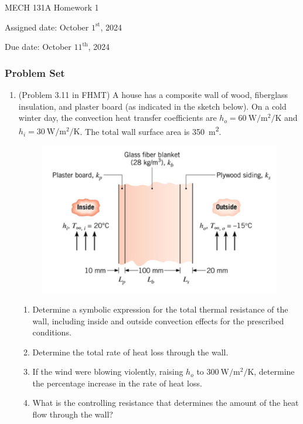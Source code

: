 \documentclass[12pt,letterpaper]{article}
\begin{document}
\noindent
MECH 131A Homework 1

\noindent
Assigned date: October $1^{\mathrm{st}}$, 2024

\noindent
Due date: October $11^{\mathrm{th}}$, 2024

\subsubsection*{Problem Set}
\begin{enumerate}

\item  (Problem 3.11 in FHMT) A house has a composite wall of wood, fiberglass insulation, and plaster board (as indicated in the sketch below).
On a cold winter day, the convection heat transfer coefficients are $h_o = \SI{60}{\watt\per\square\meter\per\kelvin}$ and $h_i = \SI{30}{\watt\per\square\meter\per\kelvin}$.
The total wall surface area is \SI{350}{\square\meter}.

\begin{figure}[!htpb]
	\centering
	\includegraphics[width=0.75\linewidth]{./image0.png}
\end{figure}

	\begin{enumerate}
		\item Determine a symbolic expression for the total thermal resistance of the wall, including inside and outside convection effects for the prescribed conditions.
		\item Determine the total rate of heat loss through the wall.
		\item If the wind were blowing violently, raising $h_o$ to $\SI{300}{\watt\per\square\meter\per\kelvin}$, determine the percentage increase in the rate of heat loss.
		\item What is the controlling resistance that determines the amount of the heat flow through the wall?
	\end{enumerate}


\end{enumerate}
\end{document}
